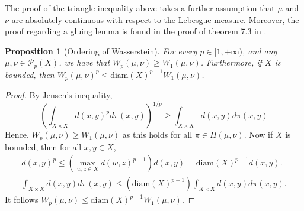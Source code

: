 \documentclass[12pt]{article}
\theoremstyle{plain}
\newtheorem{prop}{Proposition}[section]
\numberwithin{equation}{section}
\begin{document}
The proof of the triangle inequality above takes a further assumption that $\mu$ and $\nu$ are absolutely continuous with respect to the Lebesgue measure.
Moreover, the proof regarding a gluing lemma is found in the proof of theorem 7.3 in \cite{villani}.
\begin{prop}[Ordering of Wasserstein]
  For every $p\in [1,+\infty)$, and any $\mu,\nu\in \mathcal{P}_p(X)$, we have that $W_p(\mu,\nu) \ge W_1(\mu,\nu)$. Furthermore, if $X$ is bounded, then $W_p(\mu,\nu)^p \le \text{diam}(X)^{p-1}W_1(\mu,\nu)$.
\end{prop}
\begin{proof}
  By Jensen's inequality,
  \begin{equation*}
    \left(\int_{X\times X} d(x,y)^pd\pi(x,y)\right)^{1/p} \ge \int_{X\times X} d(x,y)d\pi(x,y)
  \end{equation*}
  Hence, $W_p(\mu,\nu) \ge W_1(\mu,\nu)$ as this holds for all $\pi\in \Pi(\mu,\nu)$.\newline
  Now if $X$ is bounded, then for all $x,y\in X$,
  \begin{align*}
    d(x,y)^p \le (\max_{w,z\in X} d(w,z)^{p-1})d(x,y) = \text{diam}(X)^{p-1}d(x,y). \\
    \int_{X\times X} d(x,y)d\pi(x,y)\le (\text{diam}(X)^{p-1})\int_{X\times X}d(x,y)d\pi(x,y).
  \end{align*}
  It follows $W_p(\mu,\nu) \le \text{diam}(X)^{p-1}W_1(\mu,\nu).$
\end{proof}
\end{document}
